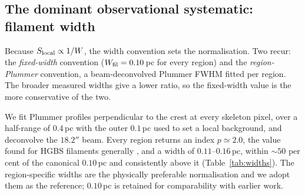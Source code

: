 \documentclass[usenatbib,twoside,twocolumn]{mnras}
\begin{document}
\subsection{The dominant observational systematic: filament width}
\label{sec:width}

Because $S_{\rm local}\propto1/W$, the width convention sets the normalisation. Two recur: the \emph{fixed-width} convention ($W_{\rm fil}=0.10$\,pc for every region) and the \emph{region-Plummer} convention, a beam-deconvolved Plummer FWHM fitted per region. The broader measured widths give a lower ratio, so the fixed-width value is the more conservative of the two.

We fit Plummer profiles perpendicular to the crest at every skeleton pixel, over a half-range of $0.4$\,pc with the outer $0.1$\,pc used to set a local background, and deconvolve the $18.2''$ beam. Every region returns an index $p\simeq2.0$, the value found for HGBS filaments generally \citep{Arzoumanian2019}, and a width of $0.11$--$0.16$\,pc, within $\sim50$ per cent of the canonical $0.10$\,pc and consistently above it (Table~\ref{tab:widths}). The region-specific widths are the physically preferable normalisation and we adopt them as the reference; $0.10$\,pc is retained for comparability with earlier work.
\end{document}
